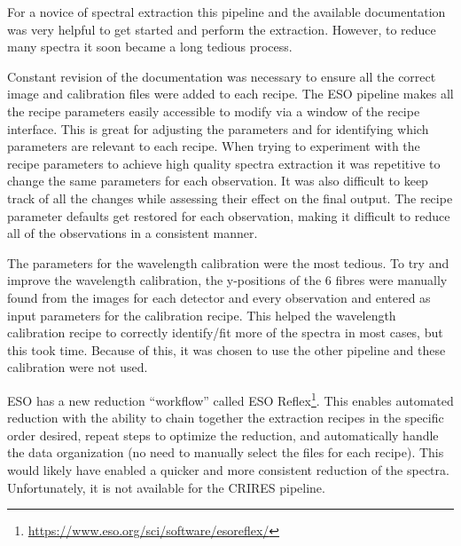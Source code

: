For a novice of spectral extraction this pipeline and the available documentation was very helpful to get started and perform the extraction.
However, to reduce many spectra it soon became a long tedious process.

Constant revision of the documentation was necessary to ensure all the correct image and calibration files were added to each recipe.
The {ESO} pipeline makes all the recipe parameters easily accessible to modify via a window of the recipe interface.
This is great for adjusting the parameters and for identifying which parameters are relevant to each recipe.
When trying to experiment with the recipe parameters to achieve high quality spectra extraction it was repetitive to change the same parameters for each observation.
It was also difficult to keep track of all the changes while assessing their effect on the final output.
The recipe parameter defaults get restored for each observation, making it difficult to reduce all of the observations in a consistent manner.

The parameters for the wavelength calibration were the most tedious.
To try and improve the wavelength calibration, the {y-positions} of the 6 \thar{} fibres were manually found from the images for each detector and every observation and entered as input parameters for the calibration recipe.
This helped the wavelength calibration recipe to correctly identify/fit more of the \thar{} spectra in most cases, but this took time.
Because of this, it was chosen to use the other pipeline and these calibration were not used.

{ESO} has a new reduction ``workflow'' called {ESO} Reflex\citep{freudling_automated_2013}\footnote{\href{https://www.eso.org/sci/software/esoreflex/}{https://www.eso.org/sci/software/esoreflex/}}.
This enables automated reduction with the ability to chain together the extraction recipes in the specific order desired, repeat steps to optimize the reduction, and automatically handle the data organization (no need to manually select the files for each recipe).
This would likely have enabled a quicker and more consistent reduction of the spectra.
Unfortunately, it is not available for the {CRIRES} pipeline.

